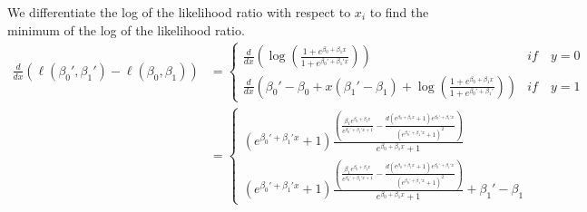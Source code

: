 We differentiate the log of the likelihood ratio with respect to $x_i$ to find the minimum of the log of the likelihood ratio. 
\begin{equation}
\begin{split}
    \frac{d}{dx} \left(\ell \left(\beta_0', \beta_1'\right) - \ell\left(\beta_0, \beta_1\right)\right) &= \begin{cases}
    \frac{d}{dx}\left(\log \left(\frac{1 + e^{\beta_0 + \beta_1 x}}{1 + e^{\beta_0' + \beta_1'x}}\right)\right) & if \quad y = 0 \\
    \frac{d}{dx} \left(\beta_0' -  \beta_0 + x \left(\beta_1' - \beta_1\right) + \log \left(\frac{1 + e^{\beta_0 + \beta_1 x}}{1 + e^{\beta_0' + \beta_1'}}\right)\right) & if \quad y = 1 \end{cases}
    \\ & = \begin{cases}
    \left(e^{\beta_0' + \beta_1'x} + 1\right)\frac{\left(\frac{\beta_1 e^{\beta_0 + \beta_1x}}{e^{\beta_0' + \beta_1'x + 1}} - \frac{d \left(e^{\beta_0 + \beta_1x} + 1\right)e^{\beta_0' + \beta_1'x}}{\left(e^{\beta_0' + \beta_1'x}+1\right)^2}\right)}{e^{\beta_0 + \beta_1x} + 1}
    \\\left(e^{\beta_0' + \beta_1'x} + 1\right)\frac{\left(\frac{\beta_1 e^{\beta_0 + \beta_1x}}{e^{\beta_0' + \beta_1'x + 1}} - \frac{d \left(e^{\beta_0 + \beta_1x} + 1\right)e^{\beta_0' + \beta_1'x}}{\left(e^{\beta_0' + \beta_1'x}+1\right)^2}\right)}{e^{\beta_0 + \beta_1x} + 1} + \beta_1' - \beta_1
    \end{cases}
\end{split}
\end{equation}
